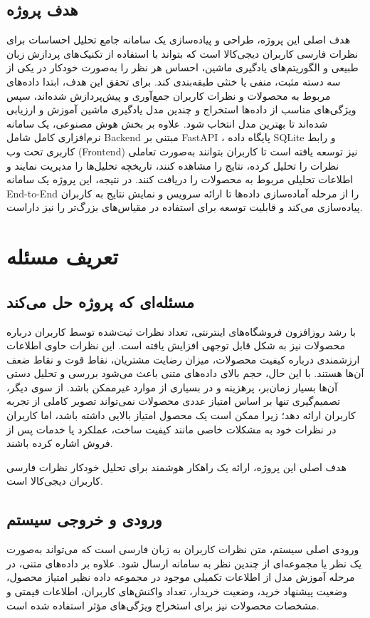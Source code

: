 \subsection{هدف پروژه}
هدف اصلی این پروژه، طراحی و پیاده‌سازی یک سامانه جامع تحلیل احساسات برای نظرات فارسی کاربران دیجی‌کالا است که بتواند با استفاده از تکنیک‌های پردازش زبان طبیعی و الگوریتم‌های یادگیری ماشین، احساس هر نظر را به‌صورت خودکار در یکی از سه دسته مثبت، منفی یا خنثی طبقه‌بندی کند. برای تحقق این هدف، ابتدا داده‌های مربوط به محصولات و نظرات کاربران جمع‌آوری و پیش‌پردازش شده‌اند، سپس ویژگی‌های مناسب از داده‌ها استخراج و چندین مدل یادگیری ماشین آموزش و ارزیابی شده‌اند تا بهترین مدل انتخاب شود. علاوه بر بخش هوش مصنوعی، یک سامانه نرم‌افزاری کامل شامل Backend مبتنی بر FastAPI ، پایگاه داده SQLite و رابط کاربری تحت وب (Frontend) نیز توسعه یافته است تا کاربران بتوانند به‌صورت تعاملی نظرات را تحلیل کرده، نتایج را مشاهده کنند، تاریخچه تحلیل‌ها را مدیریت نمایند و اطلاعات تحلیلی مربوط به محصولات را دریافت کنند. در نتیجه، این پروژه یک سامانه End-to-End را از مرحله آماده‌سازی داده‌ها تا ارائه سرویس و نمایش نتایج به کاربران پیاده‌سازی می‌کند و قابلیت توسعه برای استفاده در مقیاس‌های بزرگ‌تر را نیز داراست.


\section{تعریف مسئله}
\subsection{مسئله‌ای که پروژه حل می‌کند}
با رشد روزافزون فروشگاه‌های اینترنتی، تعداد نظرات ثبت‌شده توسط کاربران درباره محصولات نیز به شکل قابل توجهی افزایش یافته است. این نظرات حاوی اطلاعات ارزشمندی درباره کیفیت محصولات، میزان رضایت مشتریان، نقاط قوت و نقاط ضعف آن‌ها هستند. با این حال، حجم بالای داده‌های متنی باعث می‌شود بررسی و تحلیل دستی آن‌ها بسیار زمان‌بر، پرهزینه و در بسیاری از موارد غیرممکن باشد. از سوی دیگر، تصمیم‌گیری تنها بر اساس امتیاز عددی محصولات نمی‌تواند تصویر کاملی از تجربه کاربران ارائه دهد؛ زیرا ممکن است یک محصول امتیاز بالایی داشته باشد، اما کاربران در نظرات خود به مشکلات خاصی مانند کیفیت ساخت، عملکرد یا خدمات پس از فروش اشاره کرده باشند.

هدف اصلی این پروژه، ارائه یک راهکار هوشمند برای تحلیل خودکار نظرات فارسی کاربران دیجی‌کالا است.
\subsection{ورودی و خروجی سیستم}
ورودی اصلی سیستم، متن نظرات کاربران به زبان فارسی است که می‌تواند به‌صورت یک نظر یا مجموعه‌ای از چندین نظر به سامانه ارسال شود. علاوه بر داده‌های متنی، در مرحله آموزش مدل از اطلاعات تکمیلی موجود در مجموعه داده نظیر امتیاز محصول، وضعیت پیشنهاد خرید، وضعیت خریدار، تعداد واکنش‌های کاربران، اطلاعات قیمتی و مشخصات محصولات نیز برای استخراج ویژگی‌های مؤثر استفاده شده است.

